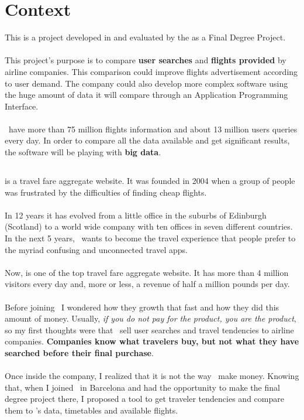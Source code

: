 
\chapter{Context}

\label{chapter01}

This is a project developed in \textit{\company} and evaluated by the \textit{\univname} as a Final Degree Project.
\\\\
This project's purpose is to compare \textbf{user searches} and \textbf{flights provided} by airline companies. This comparison could improve flights advertisement according to user demand. The company could also develop more complex software using the huge amount of data it will compare through an Application Programming Interface.
\\\\
\company\ have more than 75 million flights information and about 13 million users queries every day. In order to compare all the data available and get significant results, the software will be playing with \textbf{big data}.


\section{\company}

\company\cite{skyscanner_strategy} is a travel fare aggregate website. It was founded in 2004 when a group of people was frustrated by the difficulties of finding cheap flights.
\\\\
In 12 years it has evolved from a little office in the suburbs of Edinburgh (Scotland) to a world wide company with ten offices in seven different countries. In the next 5 years, \company\ wants to become the travel experience that people prefer to the myriad confusing and unconnected travel apps.
\\\\
Now, is one of the top travel fare aggregate website. It has more than 4 million visitors every day and, more or less, a revenue of half a million pounds per day.
\\\\
Before joining \company\ I wondered how they growth that fast and how they did this amount of money. Usually, \textit{if you do not pay for the product, you are the product}, so my first thoughts were that \company\ sell user searches and travel tendencies to airline companies. \textbf{Companies know what travelers buy, but not what they have searched before their final purchase}.
\\\\
Once inside the company, I realized that it is not the way \company\ make money. Knowing that, when I joined \squad\ in Barcelona and had the opportunity to make the final degree project there, I proposed a tool to get traveler tendencies and compare them to \squad's data, timetables and available flights.

